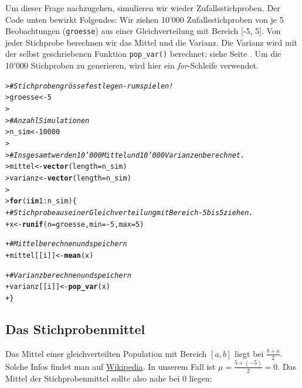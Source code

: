 \documentclass[oneside, 10pt]{book}\usepackage[]{graphicx}\usepackage[]{xcolor}
\makeatletter
\newcommand{\hlnum}[1]{\textcolor[rgb]{0.686,0.059,0.569}{#1}}%
\newcommand{\hlcom}[1]{\textcolor[rgb]{0.678,0.584,0.686}{\textit{#1}}}%
\newcommand{\hlopt}[1]{\textcolor[rgb]{0,0,0}{#1}}%
\newcommand{\hlstd}[1]{\textcolor[rgb]{0.345,0.345,0.345}{#1}}%
\newcommand{\hlkwa}[1]{\textcolor[rgb]{0.161,0.373,0.58}{\textbf{#1}}}%
\newcommand{\hlkwb}[1]{\textcolor[rgb]{0.69,0.353,0.396}{#1}}%
\newcommand{\hlkwc}[1]{\textcolor[rgb]{0.333,0.667,0.333}{#1}}%
\newcommand{\hlkwd}[1]{\textcolor[rgb]{0.737,0.353,0.396}{\textbf{#1}}}%
\newenvironment{kframe}{%
 \def\at@end@of@kframe{}%
 \ifinner\ifhmode%
  \def\at@end@of@kframe{\end{minipage}}%
  \begin{minipage}{\columnwidth}%
 \fi\fi%
 \def\FrameCommand##1{\hskip\@totalleftmargin \hskip-\fboxsep
 \colorbox{shadecolor}{##1}\hskip-\fboxsep
     \hskip-\linewidth \hskip-\@totalleftmargin \hskip\columnwidth}%
 \MakeFramed {\advance\hsize-\width
   \@totalleftmargin\z@ \linewidth\hsize
   \@setminipage}}%
 {\par\unskip\endMakeFramed%
 \at@end@of@kframe}
\newenvironment{knitrout}{}{} %
\makeatother
\begin{document}
Um dieser Frage nachzugehen, simulieren
wir wieder Zufallsstichproben. Der Code unten
bewirkt Folgendes: Wir ziehen 10'000 Zufallsstichproben
von je 5 Beobachtungen (\texttt{groesse}) aus
einer Gleichverteilung mit Bereich [-5, 5].
Von jeder Stichprobe berechnen wir das Mittel
und die Varianz.
Die Varianz wird mit der selbst geschriebenen Funktion
\texttt{pop\_var()} berechnet; siehe Seite \pageref{popvar}.
Um die 10'000 Stichproben zu generieren, wird hier ein
\textit{for}-Schleife verwendet.

\label{code:stichprobenmittel}
\begin{knitrout}
\color{fgcolor}\begin{kframe}
\begin{alltt}
\hlstd{> }\hlcom{# Stichprobengrösse festlegen - rumspielen!}
\hlstd{> }\hlstd{groesse} \hlkwb{<-} \hlnum{5}
\hlstd{> }
\hlstd{> }\hlcom{# Anzahl Simulationen}
\hlstd{> }\hlstd{n_sim} \hlkwb{<-} \hlnum{10000}
\hlstd{> }
\hlstd{> }\hlcom{# Insgesamt werden 10'000 Mittel und 10'000 Varianzen berechnet.}
\hlstd{> }\hlstd{mittel} \hlkwb{<-} \hlkwd{vector}\hlstd{(}\hlkwc{length} \hlstd{= n_sim)}
\hlstd{> }\hlstd{varianz} \hlkwb{<-} \hlkwd{vector}\hlstd{(}\hlkwc{length} \hlstd{= n_sim)}
\hlstd{> }
\hlstd{> }\hlkwa{for} \hlstd{(i} \hlkwa{in} \hlnum{1}\hlopt{:}\hlstd{n_sim) \{}
\hlstd{+ }  \hlcom{# Stichprobe aus einer Gleichverteilung mit Bereich -5 bis 5 ziehen.}
\hlstd{+ }  \hlstd{x} \hlkwb{<-} \hlkwd{runif}\hlstd{(}\hlkwc{n} \hlstd{= groesse,} \hlkwc{min} \hlstd{=} \hlopt{-}\hlnum{5}\hlstd{,} \hlkwc{max} \hlstd{=} \hlnum{5}\hlstd{)}

\hlstd{+ }  \hlcom{# Mittel berechnen und speichern}
\hlstd{+ }  \hlstd{mittel[[i]]} \hlkwb{<-} \hlkwd{mean}\hlstd{(x)}

\hlstd{+ }  \hlcom{# Varianz berechnen und speichern}
\hlstd{+ }  \hlstd{varianz[[i]]} \hlkwb{<-} \hlkwd{pop_var}\hlstd{(x)}
\hlstd{+ }\hlstd{\}}
\end{alltt}
\end{kframe}
\end{knitrout}

\subsection{Das Stichprobenmittel}\label{sec:stichprobenmittel}
Das Mittel einer gleichverteilten Population mit Bereich
$[a, b]$ liegt bei $\frac{b+a}{2}$. Solche Infos findet man auf
\href{https://en.wikipedia.org/wiki/Uniform\_distribution\_(continuous)}{Wikipedia}.
In unserem Fall ist
$\mu = \frac{5 + (-5)}{2} = 0$. Das Mittel der Stichprobenmittel
sollte also nahe bei 0 liegen:
\end{document}
